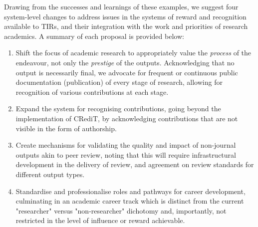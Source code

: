 \documentclass[authordate,meta]{jote-new-article}
\begin{document}
Drawing from the successes and learnings of these examples, we suggest four system-level changes to address issues in the systems of reward and recognition available to TIRs, and their integration with the work and priorities of research academics. A summary of each proposal is provided below:






\begin{enumerate}

  \item Shift the focus of academic research to appropriately value the \emph{process} of the endeavour, not only the \emph{prestige} of the outputs. Acknowledging that no output is necessarily final, we advocate for frequent or continuous public documentation (publication) of every stage of research, allowing for recognition of various contributions at each stage.







  \item Expand the system for recognising contributions, going beyond the implementation of CRediT, by acknowledging contributions that are not visible in the form of authorship.







  \item Create mechanisms for validating the quality and impact of non-journal outputs akin to peer review, noting that this will require infrastructural development in the delivery of review, and agreement on review standards for different output types.







  \item Standardise and professionalise roles and pathways for career development, culminating in an academic career track which is distinct from the current "researcher" versus "non-researcher" dichotomy and, importantly, not restricted in the level of influence or reward achievable.

\end{enumerate}
\end{document}
